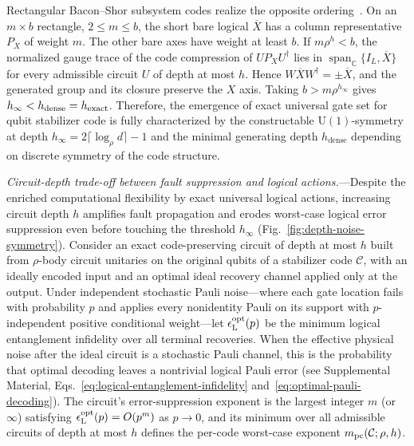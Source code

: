 \documentclass[aps,prl,reprint,notitlepage,nofootinbib,nobibnotes]{revtex4-2}
\newcommand{\id}{I}
\begin{document}
Rectangular Bacon--Shor subsystem codes realize the opposite ordering~\cite{Supplement}. On an
$m\times b$ rectangle, $2\le m\le b$, the short bare logical $\overline X$ has a column
representative $P_X$ of weight $m$. The other bare axes have weight at least $b$. If $m\rho^h<b$,
the normalized gauge trace of the code compression of $UP_XU^\dagger$ lies in
$\operatorname{span}_{\mathbb C}\{\id_L,\overline X\}$ for every admissible circuit $U$ of depth at
most $h$. Hence $W\overline XW^\dagger=\pm\overline X$, and the generated group and its closure
preserve the $X$ axis. Taking $b>m\rho^{h_\infty}$ gives $h_\infty<h_{\rm dense}=h_{\rm exact}$. Therefore, the emergence of exact universal gate set for qubit stabilizer code is fully characterized by the constructable  $\mathrm{U}(1)$-symmetry at depth $h_{\infty}=2\lceil \log_{\rho}d\rceil-1$ and the minimal generating depth $h_{\mathrm{dense}}$ depending on discrete symmetry of the code structure.

\textit{Circuit-depth trade-off between fault suppression and logical actions.}---Despite the enriched computational flexibility by exact universal logical actions, increasing circuit depth $h$ amplifies fault propagation and erodes worst-case logical error
suppression even before touching the threshold $h_{\infty}$ (Fig.~\ref{fig:depth-noise-symmetry}).
Consider an exact code-preserving circuit of depth at most $h$ built from $\rho$-body circuit
unitaries on the original qubits of a stabilizer code  $\mathcal C$, with an ideally
encoded input and an optimal ideal recovery channel applied only at the output. Under independent
stochastic Pauli noise---where each gate location fails with probability $p$ and applies every
nonidentity Pauli on its support with $p$-independent positive conditional weight---let
$\epsilon_{\rm L}^{\rm opt}(p)$ be the minimum logical entanglement infidelity over all terminal
recoveries. When the effective physical noise after the ideal circuit is a stochastic Pauli
channel, this is the probability that optimal decoding leaves a nontrivial logical Pauli error (see
Supplemental Material, Eqs.~\eqref{eq:logical-entanglement-infidelity}
and~\eqref{eq:optimal-pauli-decoding}). The circuit's error-suppression exponent is the largest
integer $m$ (or $\infty$) satisfying $\epsilon_{\rm L}^{\rm opt}(p)=O(p^m)$ as $p\to0$, and its
minimum over all admissible circuits of depth at most $h$ defines the per-code worst-case exponent
$m_{\rm pc}(\mathcal C;\rho,h)$.
\end{document}
